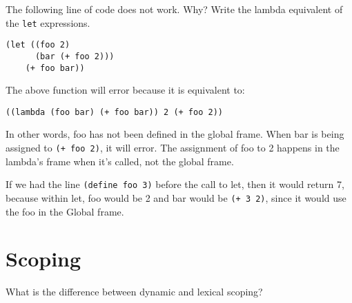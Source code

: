 \documentclass{exam}
\begin{document}
\begin{questions}
\begin{parts}
\end{parts}

\begin{blocksection}
\question The following line of code does not work. Why? Write the lambda
equivalent of the \texttt{let} expressions.

\begin{lstlisting}
(let ((foo 2)
      (bar (+ foo 2)))
    (+ foo bar))
\end{lstlisting}
\begin{solution}[0.5in]
The above function will error because it is equivalent to:
\begin{lstlisting}
((lambda (foo bar) (+ foo bar)) 2 (+ foo 2))
\end{lstlisting}

In other words, foo has not been defined in the global frame. When bar is being
assigned to \texttt{(+ foo 2)}, it will error. The assignment of foo to 2
happens in the lambda’s frame when it's called, not the global frame.

If we had the line \texttt{(define foo 3)} before the call to let, then it would
return 7, because within let, foo would be 2 and bar would be \texttt{(+ 3 2)},
since it would use the foo in the Global frame.
\end{solution}

\end{blocksection}

\section{Scoping}

\begin{blocksection}
\question What is the difference between dynamic and lexical scoping?


\end{blocksection}
\end{questions}
\end{document}
